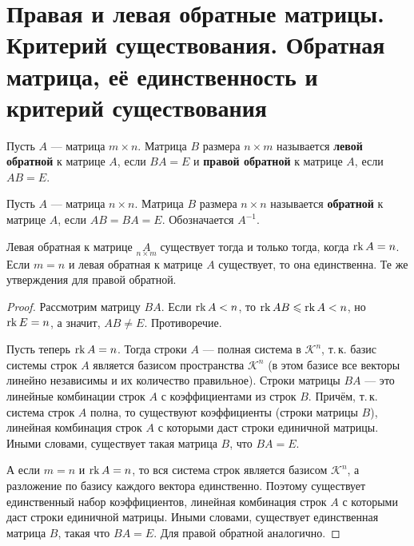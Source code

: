 \section{Правая и левая обратные матрицы. Критерий существования. Обратная матрица, её единственность и критерий существования}

\begin{definition}
    Пусть $A$ --- матрица $m \times n$. Матрица $B$ размера $n \times m$ называется \textbf{левой обратной} к матрице $A$, если $BA = E$ и \textbf{правой обратной} к матрице $A$, если $AB = E$.
\end{definition}

\begin{definition}
    Пусть $A$ --- матрица $n \times n$. Матрица $B$ размера $n \times n$ называется \textbf{обратной} к матрице $A$, если $AB = BA = E$. Обозначается $A^{-1}$.
\end{definition}

\begin{theorem}
    Левая обратная к матрице $\underset{n \times m}{A}$ существует тогда и только тогда, когда $\mathrm{rk}\, A = n$. Если $m = n$ и левая обратная к матрице $A$ существует, то она единственна. Те же утверждения для правой обратной.
\end{theorem}

\begin{proof}
    Рассмотрим матрицу $BA$. Если $\mathrm{rk}\, A < n$, то $\mathrm{rk}\, AB \leqslant \mathrm{rk}\, A < n$, но $\mathrm{rk}\, E = n$, а значит, $AB \ne E$. Противоречие.

    Пусть теперь $\mathrm{rk}\, A = n$. Тогда строки $A$ --- полная система в $\mathcal{K}^n$, т.\,к. базис системы строк $A$ является базисом пространства $\mathcal{K}^n$ (в этом базисе все векторы линейно независимы и их количество правильное). Строки матрицы $BA$ --- это линейные комбинации строк $A$ с коэффициентами из строк $B$. Причём, т.\,к. система строк $A$ полна, то существуют коэффициенты (строки матрицы $B$), линейная комбинация строк $A$ с которыми даст строки единичной матрицы. Иными словами, существует такая матрица $B$, что $BA = E$.

    А если $m = n$ и $\mathrm{rk}\, A = n$, то вся система строк является базисом $\mathcal{K}^n$, а разложение по базису каждого вектора единственно. Поэтому существует единственный набор коэффициентов, линейная комбинация строк $A$ с которыми даст строки единичной матрицы. Иными словами, существует единственная матрица $B$, такая что $BA = E$. Для правой обратной аналогично.
\end{proof}

